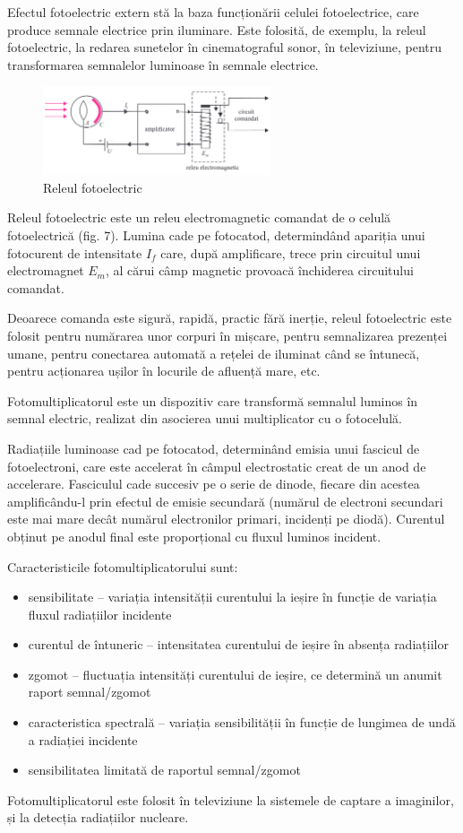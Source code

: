 Efectul fotoelectric extern stă la baza funcționării celulei fotoelectrice,
care produce semnale electrice prin iluminare. Este folosită, de exemplu, la
releul fotoelectric, la redarea sunetelor în cinematograful sonor, în
televiziune, pentru transformarea semnalelor luminoase în semnale electrice.

\begin{figure}
    \includegraphics[width=0.6\textwidth]{fig/releu_fotoelectric}
    \caption{Releul fotoelectric}
\end{figure}

Releul fotoelectric este un releu electromagnetic comandat de o celulă
fotoelectrică (fig. 7). Lumina cade pe fotocatod, determindând apariția unui
fotocurent de intensitate $I_f$ care, după amplificare, trece prin circuitul
unui electromagnet $E_m$, al cărui câmp magnetic provoacă închiderea circuitului
comandat.

Deoarece comanda este sigură, rapidă, practic fără inerție, releul fotoelectric
este folosit pentru numărarea unor corpuri în mișcare, pentru semnalizarea
prezenței umane, pentru conectarea automată a rețelei de iluminat când se
întunecă, pentru acționarea ușilor în locurile de afluență mare, etc.

\parbreak

Fotomultiplicatorul este un dispozitiv care transformă semnalul luminos
în semnal electric, realizat din asocierea unui multiplicator cu o
fotocelulă.

Radiațiile luminoase cad pe fotocatod, determinând emisia unui fascicul de
fotoelectroni, care este accelerat în câmpul electrostatic creat de un anod de
accelerare. Fasciculul cade succesiv pe o serie de dinode, fiecare din acestea
amplificându-l prin efectul de emisie secundară (numărul de electroni secundari
este mai mare decât numărul electronilor primari, incidenți pe diodă). Curentul
obținut pe anodul final este proporțional cu fluxul luminos incident.

Caracteristicile fotomultiplicatorului sunt:
\begin{itemize}
    \item sensibilitate -- variația intensității curentului la ieșire în
        funcție de variația fluxul radiațiilor incidente
    \item curentul de întuneric -- intensitatea curentului de ieșire în
        absența radiațiilor
    \item zgomot -- fluctuația intensități curentului de ieșire, ce determină
        un anumit raport semnal/zgomot
    \item caracteristica spectrală -- variația sensibilității în funcție
        de lungimea de undă a radiației incidente
    \item sensibilitatea limitată de raportul semnal/zgomot
\end{itemize}

Fotomultiplicatorul este folosit în televiziune la sistemele de captare a
imaginilor, și la detecția radiațiilor nucleare.
